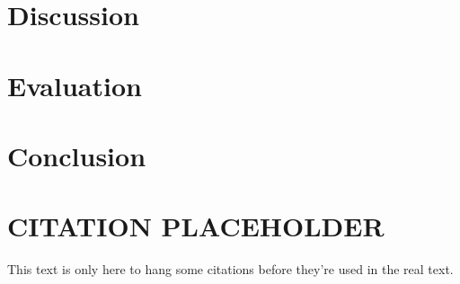 \documentclass[11pt,conference]{IEEEtran}
\begin{document}
\section{Discussion}




\section{Evaluation}



\section{Conclusion}



\section{CITATION PLACEHOLDER}

This text is only here to hang some citations before they're used in the real
text.
\cite{linuxjournal_dht}
\cite{chord}
\cite{parallel}
\cite{Balakrishnan:2003:LUD:606272.606299}




\end{document}
